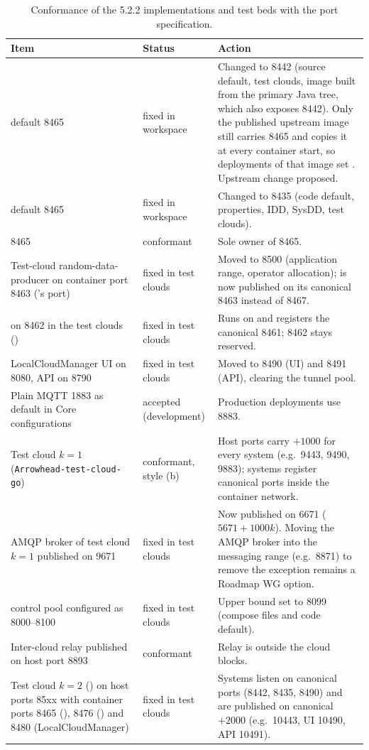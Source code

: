 \begin{table}[h!]
\centering\footnotesize
\begin{tabularx}{\textwidth}{|P{4.3cm}|P{3.3cm}|Y|}\hline
{}Item & Status & Action \\\hline
{} default 8465 & fixed in workspace & Changed to 8442 (source default, test clouds, image built from the primary Java tree, which also exposes 8442). Only the published upstream image still carries 8465 and copies it at every container start, so deployments of that image set . Upstream change proposed. \\\hline
{} default 8465 & fixed in workspace & Changed to 8435 (code default, properties, IDD, SysDD, test clouds). \\\hline
{} 8465 & conformant & Sole owner of 8465. \\\hline
Test-cloud random-data-producer on container port 8463 ('s port) & fixed in test clouds & Moved to 8500 (application range, operator allocation);  is now published on its canonical 8463 instead of 8467. \\\hline
{} on 8462 in the test clouds () & fixed in test clouds & Runs on and registers the canonical 8461; 8462 stays reserved. \\\hline
LocalCloudManager UI on 8080, API on 8790 & fixed in test clouds & Moved to 8490 (UI) and 8491 (API), clearing the tunnel pool. \\\hline
Plain MQTT 1883 as  default in Core configurations & accepted (development) & Production deployments use 8883. \\\hline
Test cloud $k=1$ (\texttt{Arrowhead-test-cloud-go}) & conformant, style (b) & Host ports carry $+1000$ for every system (e.g.\ 9443, 9490, 9883); systems register canonical ports inside the container network. \\\hline
AMQP broker of test cloud $k=1$ published on 9671 & fixed in test clouds & Now published on 6671 ($5671+1000k$). Moving the AMQP broker into the messaging range (e.g.\ 8871) to remove the exception remains a Roadmap WG option. \\\hline
{} control pool configured as 8000--8100 & fixed in test clouds & Upper bound set to 8099 (compose files and code default). \\\hline
Inter-cloud relay published on host port 8893 & conformant & Relay is outside the cloud blocks. \\\hline
Test cloud $k=2$ () on host ports 85xx with container ports 8465 (), 8476 () and 8480 (LocalCloudManager) & fixed in test clouds & Systems listen on canonical ports (8442, 8435, 8490) and are published on canonical $+2000$ (e.g.\ 10443, UI 10490, API 10491). \\\hline
\end{tabularx}
\caption{Conformance of the 5.2.2 implementations and test beds with the port specification.}
\label{tab:portconf}
\end{table}
